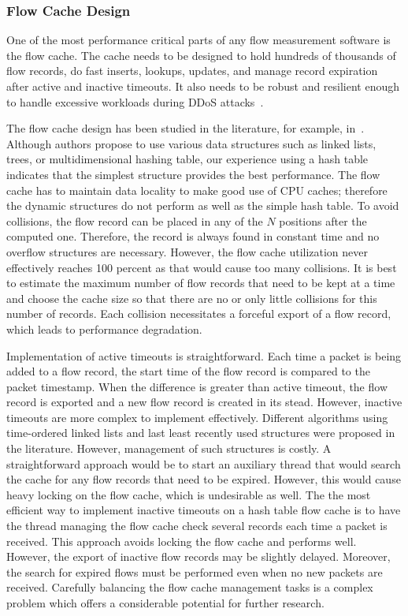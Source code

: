 \subsubsection{Flow Cache Design}

One of the most performance critical parts of any flow measurement software is the flow cache. The cache needs to be designed to hold hundreds of thousands of flow records, do fast inserts, lookups, updates, and manage record expiration after active and inactive timeouts. It also needs to be robust and resilient enough to handle excessive workloads during DDoS attacks~\cite{Sadre-2012-Effects}. 

The flow cache design has been studied in the literature, for example, in~\cite{Wang-2011-Memory, Nassopulos-2014-Flow}. Although authors propose to use various data structures such as linked lists, trees, or multidimensional hashing table, our experience using a hash table indicates that the simplest structure provides the best performance. The flow cache has to maintain data locality to make good use of CPU caches; therefore the dynamic structures do not perform as well as the simple hash table. To avoid collisions, the flow record can be placed in any of the $N$ positions after the computed one. Therefore, the record is always found in constant time and no overflow structures are necessary. However, the flow cache utilization never effectively reaches 100 percent as that would cause too many collisions. It is best to estimate the maximum number of flow records that need to be kept at a time and choose the cache size so that there are no or only little collisions for this number of records. Each collision necessitates a forceful export of a flow record, which leads to performance degradation.

Implementation of active timeouts is straightforward. Each time a packet is being added to a flow record, the start time of the flow record is compared to the packet timestamp. When the difference is greater than active timeout, the flow record is exported and a new flow record is created in its stead. However, inactive timeouts are more complex to implement effectively. Different algorithms using time-ordered linked lists and last least recently used structures were proposed in the literature. However, management of such structures is costly. A straightforward approach would be to start an auxiliary thread that would search the cache for any flow records that need to be expired. However, this would cause heavy locking on the flow cache, which is undesirable as well. The the most efficient way to implement inactive timeouts on a hash table flow cache is to have the thread managing the flow cache check several records each time a packet is received. This approach avoids locking the flow cache and performs well. However, the export of inactive flow records may be slightly delayed. Moreover, the search for expired flows must be performed even when no new packets are received. Carefully balancing the flow cache management tasks is a complex problem which offers a considerable potential for further research.

